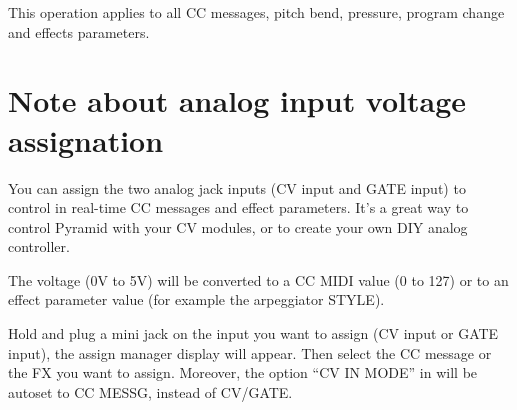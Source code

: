 This operation applies to all CC messages, pitch bend, pressure, program change and effects parameters.


\section{Note about analog input voltage assignation}

You can assign the two analog jack inputs (CV input and GATE input) to control in real-time CC messages and effect parameters. It's a great way to control Pyramid with your CV modules, or to create your own DIY analog controller.

The voltage (0V to 5V) will be converted to a CC MIDI value (0 to 127) or to an effect parameter value (for example the arpeggiator STYLE).

Hold  and plug a mini jack on the input you want to assign (CV input or GATE input), the assign manager display will appear. Then select the CC message or the FX you want to assign. Moreover, the option ``CV IN MODE'' in  will be autoset to CC MESSG, instead of CV/GATE.
